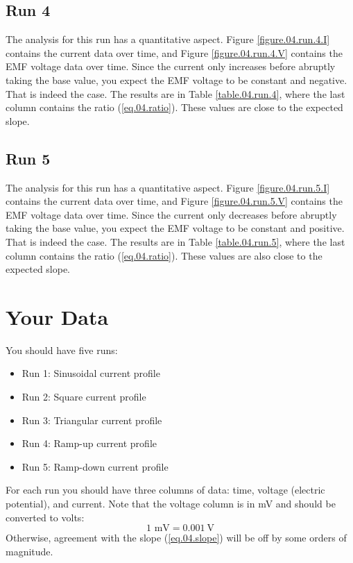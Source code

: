 \subsection{Run 4}
%
The analysis for this run has a quantitative aspect. Figure \ref{figure.04.run.4.I} contains the current data over time, and Figure \ref{figure.04.run.4.V} contains the EMF voltage data over time. Since the current only increases before abruptly taking the base value, you expect the EMF voltage to be constant and negative. That is indeed the case. The results are in Table \ref{table.04.run.4}, where the last column contains the ratio (\ref{eq.04.ratio}). These values are close to the expected slope.
%
\subsection{Run 5}
%
The analysis for this run has a quantitative aspect. Figure \ref{figure.04.run.5.I} contains the current data over time, and Figure \ref{figure.04.run.5.V} contains the EMF voltage data over time. Since the current only decreases before abruptly taking the base value, you expect the EMF voltage to be constant and positive. That is indeed the case. The results are in Table \ref{table.04.run.5}, where the last column contains the ratio (\ref{eq.04.ratio}). These values are also close to the expected slope.
%
\section{Your Data}
%
You should have five runs:
\begin{itemize}
	\item Run 1: Sinusoidal current profile
	\item Run 2: Square current profile
	\item Run 3: Triangular current profile
	\item Run 4: Ramp-up current profile
	\item Run 5: Ramp-down current profile
\end{itemize}
For each run you should have three columns of data: time, voltage (electric potential), and current. Note that the voltage column is in mV and should be converted to volts:
\begin{equation}
	1 \text{ mV} = 0.001 \ \text{V}
\end{equation}
Otherwise, agreement with the slope (\ref{eq.04.slope}) will be off by some orders of magnitude.
%
\newpage
